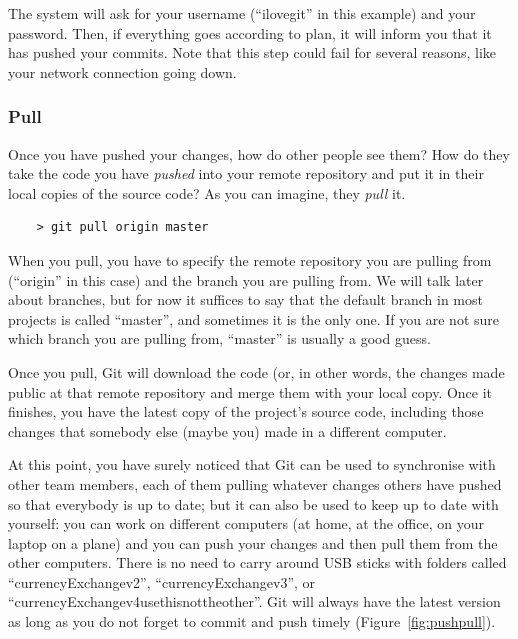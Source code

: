 The system will ask for your username (``ilovegit'' in this example)
and your password. Then, if everything goes according to plan, 
it will inform you that it has pushed your commits. Note that 
this step could
fail for several reasons, like your network connection going down. 

\subsubsection{Pull}
\label{sec:pull}

Once you have pushed your changes, how do other people see them? How
do they take the code you have \emph{pushed} into your remote
repository and put it in their local copies of the source code? As you 
can imagine, they \emph{pull} it. 

\begin{verbatim}
    > git pull origin master
\end{verbatim}

When you pull, you have to specify the remote repository you are
pulling from (``origin'' in this case) and the branch you are pulling
from. We will talk later about branches, but for now it suffices to
say that the default branch in most projects is called ``master'', and
sometimes it is the only one. If you are not sure which branch you are
pulling from, ``master'' is usually a good guess.

Once you pull, Git will download the code (or, in other words, the
changes made public at that 
remote repository and merge them with your local copy. Once it
finishes, you have the latest copy of the project's source code,
including those changes that somebody else (maybe you) made in a
different computer.  

At this point, you have surely noticed that Git can be used to
synchronise with other team members, each of them pulling whatever
changes others have pushed so that everybody is up to date; but it can
also be used to keep up to date with yourself: you can work on
different computers (at home, at the office, on your laptop on a
plane) and you can push your changes and then pull them from the other
computers. There is no need to carry around USB sticks with folders
called ``currencyExchangev2'', ``currencyExchangev3'', or
``currencyExchangev4usethisnottheother''. Git will always have the
latest version as long as you do not forget to commit and push
timely (Figure~\ref{fig:pushpull}). 

